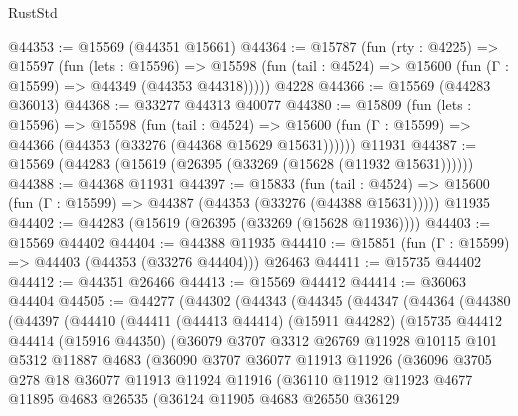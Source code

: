 \begin{lexlean}{RustStd}
\begin{coremodule}
@44353 := @15569 (@44351 @15661)
@44364 := @15787
    (fun (rty : @4225) =>
    @15597
      (fun (lets : @15596) =>
      @15598 (fun (tail : @4524) => @15600 (fun (Γ : @15599) => @44349 (@44353 @44318)))))
    @4228
@44366 := @15569 (@44283 @36013)
@44368 := @33277 @44313 @40077
@44380 := @15809
    (fun (lets : @15596) =>
    @15598
      (fun (tail : @4524) =>
      @15600 (fun (Γ : @15599) => @44366 (@44353 (@33276 (@44368 @15629 @15631))))))
    @11931
@44387 := @15569 (@44283 (@15619 (@26395 (@33269 (@15628 (@11932 @15631))))))
@44388 := @44368 @11931
@44397 := @15833
    (fun (tail : @4524) => @15600 (fun (Γ : @15599) => @44387 (@44353 (@33276 (@44388 @15631)))))
    @11935
@44402 := @44283 (@15619 (@26395 (@33269 (@15628 @11936))))
@44403 := @15569 @44402
@44404 := @44388 @11935
@44410 := @15851 (fun (Γ : @15599) => @44403 (@44353 (@33276 @44404))) @26463
@44411 := @15735 @44402
@44412 := @44351 @26466
@44413 := @15569 @44412
@44414 := @36063 @44404
@44505 := @44277
    (@44302
      (@44343
        (@44345
          (@44347
            (@44364
              (@44380
                (@44397
                  (@44410
                    (@44411
                      (@44413 @44414)
                      (@15911 @44282)
                      (@15735
                        @44412
                        @44414
                        (@15916 @44350)
                        (@36079
                          @3707
                          @3312
                          @26769
                          @11928
                          @10115
                          @101
                          @5312
                          @11887
                          @4683
                          (@36090
                            @3707
                            @36077
                            @11913
                            @11926
                            (@36096
                              @3705
                              @278
                              @18
                              @36077
                              @11913
                              @11924
                              @11916
                              (@36110
                                @11912
                                @11923
                                @4677
                                @11895
                                @4683
                                @26535
                                (@36124
                                  @11905
                                  @4683
                                  @26550
                                  @36129

\end{coremodule}
\end{lexlean}
